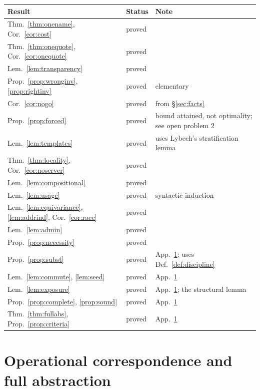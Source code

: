 \documentclass[11pt]{article}
\theoremstyle{definition}
\theoremstyle{plain}
\theoremstyle{remark}
\begin{document}
\begin{center}
\begin{tabular}{@{}llp{}@{}}
\toprule
Result & Status & Note \\
\midrule
Thm.~\ref{thm:onename}, Cor.~\ref{cor:cost} & proved & \\
Thm.~\ref{thm:onequote}, Cor.~\ref{cor:onequote} & proved & \\
Lem.~\ref{lem:transparency} & proved & \\
Prop.~\ref{prop:wronginv}, \ref{prop:rightinv} & proved & elementary \\
Cor.~\ref{cor:nogo} & proved & from \S\ref{sec:facts} \\
Prop.~\ref{prop:forced} & proved & bound attained, not optimality; see open problem 2 \\
Lem.~\ref{lem:templates} & proved & uses Lybech's stratification lemma \\
Thm.~\ref{thm:locality}, Cor.~\ref{cor:noserver} & proved & \\
Lem.~\ref{lem:compositional} & proved & \\
Lem.~\ref{lem:usage} & proved & syntactic induction \\
Lem.~\ref{lem:equivariance}, \ref{lem:addrind}, Cor.~\ref{cor:race} & proved & \\
Lem.~\ref{lem:admin} & proved & \\
Prop.~\ref{prop:necessity} & proved & \\
Prop.~\ref{prop:subst} & proved & App.~\ref{app:proofs}; uses Def.~\ref{def:discipline} \\
Lem.~\ref{lem:commute}, \ref{lem:seed} & proved & App.~\ref{app:proofs} \\
Lem.~\ref{lem:exposure} & proved & App.~\ref{app:proofs}; the structural lemma \\
Prop.~\ref{prop:complete}, \ref{prop:sound} & proved & App.~\ref{app:proofs} \\
Thm.~\ref{thm:fullabs}, Prop.~\ref{prop:criteria} & proved & App.~\ref{app:proofs} \\
\bottomrule
\end{tabular}
\end{center}

\section{Operational correspondence and full abstraction}\label{app:proofs}
\end{document}

